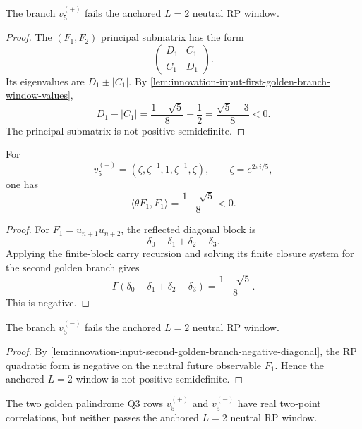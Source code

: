 \begin{theorem}
\label{thm:innovation-input-first-golden-branch-rp-failure}
The branch $v_5^{(+)}$ fails the anchored $L=2$ neutral RP window.
\end{theorem}

\begin{proof}
The $(F_1,F_2)$ principal submatrix has the form
$$
\left(
\begin{array}{cc}
D_1 & C_1\\
\overline{C_1} & D_1
\end{array}
\right).
$$
Its eigenvalues are $D_1\pm |C_1|$. By
\autoref{lem:innovation-input-first-golden-branch-window-values},
$$
D_1-|C_1|
=
\frac{1+\sqrt5}{8}-\frac12
=
\frac{\sqrt5-3}{8}
<
0.
$$
The principal submatrix is not positive semidefinite.
\end{proof}

\begin{lemma}
\label{lem:innovation-input-second-golden-branch-negative-diagonal}
For
$$
v_5^{(-)}=(\zeta,\zeta^{-1},1,\zeta^{-1},\zeta),
\qquad
\zeta=e^{2\pi i/5},
$$
one has
$$
\langle\theta F_1,F_1\rangle=\frac{1-\sqrt5}{8}<0.
$$
\end{lemma}

\begin{proof}
For $F_1=u_{n+1}\overline{u_{n+2}}$, the reflected diagonal block is
$$
\delta_0-\delta_1+\delta_2-\delta_3.
$$
Applying the finite-block carry recursion and solving its finite closure
system for the second golden branch gives
$$
\Gamma(\delta_0-\delta_1+\delta_2-\delta_3)
=
\frac{1-\sqrt5}{8}.
$$
This is negative.
\end{proof}

\begin{theorem}
\label{thm:innovation-input-second-golden-branch-rp-failure}
The branch $v_5^{(-)}$ fails the anchored $L=2$ neutral RP window.
\end{theorem}

\begin{proof}
By \autoref{lem:innovation-input-second-golden-branch-negative-diagonal},
the RP quadratic form is negative on the neutral future observable
$F_1$. Hence the anchored $L=2$ window is not positive semidefinite.
\end{proof}

\begin{theorem}
\label{thm:innovation-input-golden-palindromes-not-rp-candidates}
The two golden palindrome Q3 rows $v_5^{(+)}$ and $v_5^{(-)}$ have real
two-point correlations, but neither passes the anchored $L=2$ neutral RP
window.
\end{theorem}

